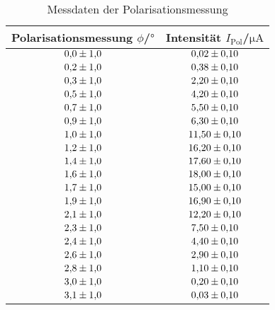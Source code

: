 \begin{table}
 \caption{Messdaten der Polarisationsmessung}
 \label{tab:polarisation}
 \centering
{} \begin{tabular}{SS}
 \toprule 
    {Polarisationsmessung $\phi$/$\si{\degree}$}& {Intensität $I_{\mathrm{Pol}}$/$\si{\micro\ampere}$} \\
     \midrule
     $\num{0.0 \pm 1.0}$ & $\num{0.02\pm0.10}$ \\
     $\num{0.2 \pm 1.0}$ & $\num{0.38\pm0.10}$ \\
     $\num{0.3 \pm 1.0}$ & $\num{2.20\pm0.10}$ \\
     $\num{0.5 \pm 1.0}$ & $\num{4.20\pm0.10}$ \\
     $\num{0.7 \pm 1.0}$ & $\num{5.50\pm0.10}$ \\
     $\num{0.9 \pm 1.0}$ & $\num{6.30\pm0.10}$ \\
     $\num{1.0 \pm 1.0}$ & $\num{11.50\pm0.10}$ \\
     $\num{1.2 \pm 1.0}$ & $\num{16.20\pm0.10}$ \\
     $\num{1.4 \pm 1.0}$ & $\num{17.60\pm0.10}$ \\
     $\num{1.6 \pm 1.0}$ & $\num{18.00\pm0.10}$ \\
     $\num{1.7 \pm 1.0}$ & $\num{15.00\pm0.10}$ \\
     $\num{1.9 \pm 1.0}$ & $\num{16.90\pm0.10}$ \\
     $\num{2.1 \pm 1.0}$ & $\num{12.20\pm0.10}$ \\
     $\num{2.3 \pm 1.0}$ & $\num{7.50\pm0.10}$ \\
     $\num{2.4 \pm 1.0}$ & $\num{4.40\pm0.10}$ \\
     $\num{2.6 \pm 1.0}$ & $\num{2.90\pm0.10}$ \\
     $\num{2.8 \pm 1.0}$ & $\num{1.10\pm0.10}$ \\
     $\num{3.0 \pm 1.0}$ & $\num{0.20\pm0.10}$ \\
     $\num{3.1 \pm 1.0}$ & $\num{0.03\pm0.10}$ \\
 \bottomrule
 \end{tabular}
\end{table}